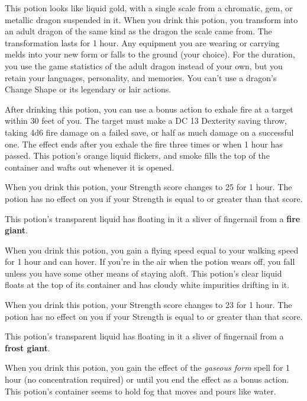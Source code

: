 \documentclass[10pt,a4paper,twoside,bg=print,twocolumn,openany,nodeprecatedcode]{dndbook}
\begin{document}
This potion looks like liquid gold, with a single scale from a chromatic, gem, or metallic dragon suspended in it. When you drink this potion, you transform into an adult dragon of the same kind as the dragon the scale came from. The transformation lasts for 1 hour. Any equipment you are wearing or carrying melds into your new form or falls to the ground (your choice). For the duration, you use the game statistics of the adult dragon instead of your own, but you retain your languages, personality, and memories. You can't use a dragon's Change Shape or its legendary or lair actions.

After drinking this potion, you can use a bonus action to exhale fire at a target within 30 feet of you. The target must make a DC 13 Dexterity saving throw, taking 4d6 fire damage on a failed save, or half as much damage on a successful one. The effect ends after you exhale the fire three times or when 1 hour has passed. This potion's orange liquid flickers, and smoke fills the top of the container and wafts out whenever it is opened.

When you drink this potion, your Strength score changes to 25 for 1 hour. The potion has no effect on you if your Strength is equal to or greater than that score.

This potion's transparent liquid has floating in it a sliver of fingernail from a \textbf{fire giant}.

When you drink this potion, you gain a flying speed equal to your walking speed for 1 hour and can hover. If you're in the air when the potion wears off, you fall unless you have some other means of staying aloft. This potion's clear liquid floats at the top of its container and has cloudy white impurities drifting in it.

When you drink this potion, your Strength score changes to 23 for 1 hour. The potion has no effect on you if your Strength is equal to or greater than that score.

This potion's transparent liquid has floating in it a sliver of fingernail from a \textbf{frost giant}.

When you drink this potion, you gain the effect of the \textit{gaseous form} spell for 1 hour (no concentration required) or until you end the effect as a bonus action. This potion's container seems to hold fog that moves and pours like water.
\end{document}
